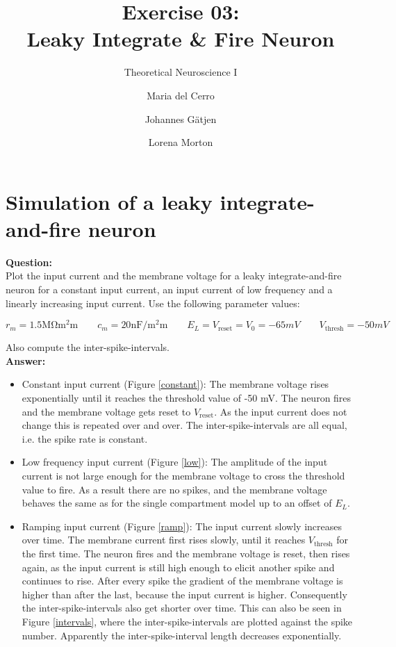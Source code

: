 \documentclass{scrartcl}
\title{Exercise 03:\\Leaky Integrate \& Fire Neuron}
\subtitle{Theoretical Neuroscience I}
\author{Maria del Cerro \and Johannes G\"atjen \and Lorena Morton}
\newcommand\Question{%
  \textbf{Question:}%
}
\newcommand\Answer{%
  \textbf{Answer:}%
}
\begin{document}
\maketitle
\section{Simulation of a leaky integrate-and-fire neuron}

\Question\\
Plot the input current and the membrane voltage for a leaky integrate-and-fire neuron for a constant input current, an input current of low frequency and a linearly increasing input current. Use the following parameter values:

\begin{equation*}
r_m = 1.5 \si{\mega\ohm\square\milli\meter} \qquad c_m = 20 \si{\nano\farad\per\square\milli\meter} \qquad E_L= V_\mathrm{reset}= V_0 = -65 \si{mV} \qquad V_\mathrm{thresh} = -50 \si{mV}
\end{equation*}

Also compute the inter-spike-intervals.
\\

\Answer\\

\begin{itemize}
\item
Constant input current (Figure \ref{constant}): The membrane voltage rises exponentially until it reaches the threshold value of -50 \si{mV}. The neuron fires and the membrane voltage gets reset to $V_\mathrm{reset}$. As the input current does not change this is repeated over and over. The inter-spike-intervals are all equal, i.e. the spike rate is constant.
\item
Low frequency input current (Figure \ref{low}): The amplitude of the input current is not large enough for the membrane voltage to cross the threshold value to fire. As a result there are no spikes, and the membrane voltage behaves the same as for the single compartment model up to an offset of $E_L$.
\item
Ramping input current (Figure \ref{ramp}): The input current slowly increases over time. The membrane current first rises slowly, until it reaches $V_\mathrm{thresh}$ for the first time. The neuron fires and the membrane voltage is reset, then rises again, as the input current is still high enough to elicit another spike and continues to rise. After every spike the gradient of the membrane voltage is higher than after the last, because the input current is higher. Consequently the inter-spike-intervals also get shorter over time. This can also be seen in Figure \ref{intervals}, where the inter-spike-intervals are plotted against the spike number. Apparently the inter-spike-interval length decreases exponentially.
\end{itemize}
\end{document}
